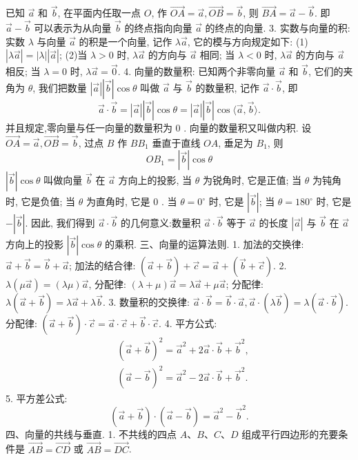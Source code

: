已知 $\vec{a}$ 和 $\vec{b}$, 在平面内任取一点 $O$, 作 $\overrightarrow{O A}=\vec{a}, \overrightarrow{O B}=\vec{b}$, 则 $\overrightarrow{B A}=\vec{a}-\vec{b}$. 即 $\vec{a}-\vec{b}$ 可以表示为从向量 $\vec{b}$ 的终点指向向量 $\vec{a}$ 的终点的向量.
3. 实数与向量的积: 实数 $\lambda$ 与向量 $\vec{a}$ 的积是一个向量, 记作 $\lambda \vec{a}$, 它的模与方向规定如下:
(1) $|\lambda \vec{a}|=|\lambda||\vec{a}|$;
(2)当 $\lambda>0$ 时, $\lambda \vec{a}$ 的方向与 $\vec{a}$ 相同; 当 $\lambda<0$ 时, $\lambda \vec{a}$ 的方向与 $\vec{a}$ 相反; 当 $\lambda=0$ 时, $\lambda \vec{a}=\overrightarrow{0}$.
4. 向量的数量积: 已知两个非零向量 $\vec{a}$ 和 $\vec{b}$, 它们的夹角为 $\theta$, 我们把数量 $|\vec{a}||\vec{b}| \cos \theta$ 叫做 $\vec{a}$ 与 $\vec{b}$ 的数量积, 记作 $\vec{a} \cdot \vec{b}$, 即
$$
\vec{a} \cdot \vec{b}=|\vec{a}||\vec{b}| \cos \theta=|\vec{a}||\vec{b}| \cos \langle\vec{a}, \vec{b}\rangle .
$$
并且规定,零向量与任一向量的数量积为 0 . 向量的数量积又叫做内积.
设 $\overrightarrow{O A}=\vec{a}, \overrightarrow{O B}=\vec{b}$, 过点 $B$ 作 $B B_1$ 垂直于直线 $O A$, 垂足为 $B_1$, 则
$$
O B_1=|\vec{b}| \cos \theta
$$
$|\vec{b}| \cos \theta$ 叫做向量 $\vec{b}$ 在 $\vec{a}$ 方向上的投影, 当 $\theta$ 为锐角时, 它是正值; 当 $\theta$ 为钝角时, 它是负值; 当 $\theta$ 为直角时, 它是 0 . 当 $\theta=0^{\circ}$ 时, 它是 $|\vec{b}|$; 当 $\theta=180^{\circ}$ 时, 它是 $-|\vec{b}|$.
因此, 我们得到 $\vec{a} \cdot \vec{b}$ 的几何意义:数量积 $\vec{a} \cdot \vec{b}$ 等于 $\vec{a}$ 的长度 $|\vec{a}|$ 与 $\vec{b}$ 在 $\vec{a}$ 方向上的投影 $|\vec{b}| \cos \theta$ 的乘积.
三、向量的运算法则.
1. 加法的交换律: $\vec{a}+\vec{b}=\vec{b}+\vec{a}$;
加法的结合律: $(\vec{a}+\vec{b})+\vec{c}=\vec{a}+(\vec{b}+\vec{c})$.
2. $\lambda(\mu \vec{a})=(\lambda \mu) \vec{a}$,
分配律: $(\lambda+\mu) \vec{a}=\lambda \vec{a}+\mu \vec{a}$;
分配律: $\lambda(\vec{a}+\vec{b})=\lambda \vec{a}+\lambda \vec{b}$.
3. 数量积的交换律: $\vec{a} \cdot \vec{b}=\vec{b} \cdot \vec{a}, \vec{a} \cdot(\lambda \vec{b})=\lambda(\vec{a} \cdot \vec{b})$.
分配律: $(\vec{a}+\vec{b}) \cdot \vec{c}=\vec{a} \cdot \vec{c}+\vec{b} \cdot \vec{c}$.
4. 平方公式:
$$
\begin{aligned}
& (\vec{a}+\vec{b})^2=\vec{a}^2+2 \vec{a} \cdot \vec{b}+\vec{b}^2, \\
& (\vec{a}-\vec{b})^2=\vec{a}^2-2 \vec{a} \cdot \vec{b}+\vec{b}^2 .
\end{aligned}
$$
5. 平方差公式:
$$
(\vec{a}+\vec{b}) \cdot(\vec{a}-\vec{b})=\vec{a}^2-\vec{b}^2 .
$$
四、向量的共线与垂直.
1. 不共线的四点 $A 、 B 、 C 、 D$ 组成平行四边形的充要条件是 $\overrightarrow{A B}=\overrightarrow{C D}$ 或 $\overrightarrow{A B}=\overrightarrow{D C}$.
